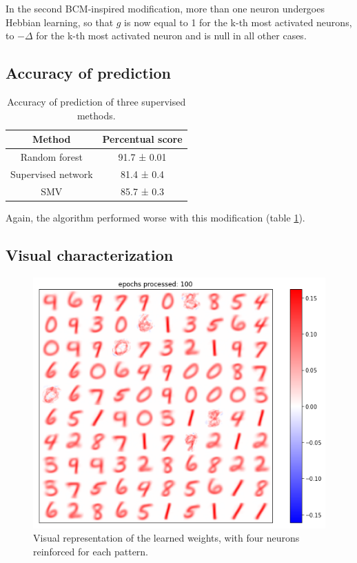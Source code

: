 \documentclass[a4paper]{report}
\begin{document}
In the second BCM-inspired modification, more than one neuron undergoes Hebbian learning, so that $g$ is now equal to 1 for the k-th most activated neurons, to $-\Delta$ for the k-th most activated neuron and is null in all other cases. 

\subsection{Accuracy of prediction}

\begin{table}[hb!]
  \begin{center}
    \begin{tabular}{c|c} %
      \textbf{Method} & \textbf{Percentual score}\\
      \hline
      Random forest & 91.7  ± 0.01\\
      Supervised network & 81.4 ± 0.4\\
      SMV & 85.7 ± 0.3\\
    \end{tabular}
  \end{center}
  \caption{Accuracy of prediction of three supervised methods.}
  \label{4tab}
\end{table}

Again, the algorithm performed worse with this modification (table \ref{4tab}).

\subsection{Visual characterization}

\begin{figure} [H]
\centering
\includegraphics [width=12cm ] {h/quattrocinque.png}
\caption{Visual representation of the learned weights, with four neurons reinforced for each pattern.}
\label{multiple}
\end{figure}
\end{document}
